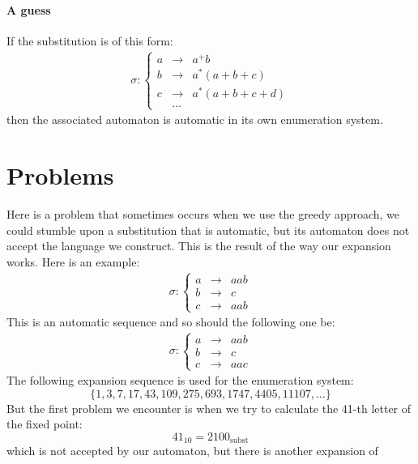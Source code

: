 \documentclass{article}
\begin{document}
\paragraph{A guess}
If the substitution is of this form:
\begin{eqnarray*}
\sigma: \left\{ \begin{array}{lll}
a &\rightarrow& a^+ b\\
b &\rightarrow& a^* (a + b + c)\\
c &\rightarrow& a^* (a + b + c + d)\\
  &...&
\end{array} \right.
\end{eqnarray*}
then the associated automaton is automatic in its own enumeration system.

\section*{Problems}
Here is a problem that sometimes occurs when we use the greedy approach, we
could stumble upon a substitution that is automatic, but its automaton does
not accept the language we construct. This is the result of the way our
expansion works. Here is an example:
\begin{eqnarray*}
\sigma: \left\{ \begin{array}{lll}
a &\rightarrow& aab\\
b &\rightarrow& c\\
c &\rightarrow& aab
\end{array} \right.
\end{eqnarray*}
This is an automatic sequence and so should the following one be:
\begin{eqnarray*}
\sigma: \left\{ \begin{array}{lll}
a &\rightarrow& aab\\
b &\rightarrow& c\\
c &\rightarrow& aac
\end{array} \right.
\end{eqnarray*}
The following expansion sequence is used for the enumeration system:
\begin{displaymath}
\{1, 3, 7, 17, 43, 109, 275, 693, 1747, 4405, 11107, ... \}
\end{displaymath}
But the first problem we encounter is when we try to calculate the 41-th
letter of the fixed point:
\begin{displaymath}
41_{10} = 2100_{\mathrm{subst}}
\end{displaymath}
which is not accepted by our automaton, but there is another expansion of
\end{document}
